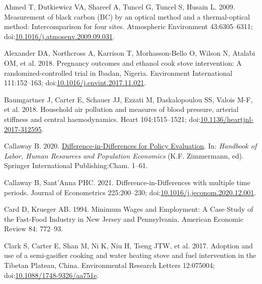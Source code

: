 \documentclass[
  letterpaper,
  DIV=11,
  numbers=noendperiod]{scrartcl}
\newlength{\cslhangindent}
\newlength{\cslentryspacingunit} %
\newenvironment{CSLReferences}[2] %
 {%
  \setlength{\parindent}{0pt}
  \ifodd #1
  \let\oldpar\par
  \def\par{\hangindent=\cslhangindent\oldpar}
  \fi
  \setlength{\parskip}{#2\cslentryspacingunit}
 }%
 {}
\begin{document}
\hypertarget{refs}{}
\begin{CSLReferences}{1}{0}
\leavevmode{}%
Ahmed T, Dutkiewicz VA, Shareef A, Tuncel G, Tuncel S, Husain L. 2009.
Measurement of black carbon ({BC}) by an optical method and a
thermal-optical method: {Intercomparison} for four sites. Atmospheric
Environment 43:6305--6311;
doi:\href{https://doi.org/10.1016/j.atmosenv.2009.09.031}{10.1016/j.atmosenv.2009.09.031}.

\leavevmode{}%
Alexander DA, Northcross A, Karrison T, Morhasson-Bello O, Wilson N,
Atalabi OM, et al. 2018. Pregnancy outcomes and ethanol cook stove
intervention: {A} randomized-controlled trial in {Ibadan}, {Nigeria}.
Environment International 111:152--163;
doi:\href{https://doi.org/10.1016/j.envint.2017.11.021}{10.1016/j.envint.2017.11.021}.

\leavevmode{}%
Baumgartner J, Carter E, Schauer JJ, Ezzati M, Daskalopoulou SS, Valois
M-F, et al. 2018. Household air pollution and measures of blood
pressure, arterial stiffness and central haemodynamics. Heart
104:1515--1521;
doi:\href{https://doi.org/10.1136/heartjnl-2017-312595}{10.1136/heartjnl-2017-312595}.

\leavevmode{}%
Callaway B. 2020.
\href{https://doi.org/10.1007/978-3-319-57365-6_352-1}{Difference-in-{Differences}
for {Policy Evaluation}}. In: \emph{Handbook of {Labor}, {Human
Resources} and {Population Economics}} (K.F. Zimmermann, ed). Springer
International Publishing:Cham. 1--61.

\leavevmode{}%
Callaway B, Sant'Anna PHC. 2021. Difference-in-{Differences} with
multiple time periods. Journal of Econometrics 225:200--230;
doi:\href{https://doi.org/10.1016/j.jeconom.2020.12.001}{10.1016/j.jeconom.2020.12.001}.

\leavevmode{}%
Card D, Krueger AB. 1994. Minimum {Wages} and {Employment}: {A Case
Study} of the {Fast-Food Industry} in {New Jersey} and {Pennsylvania}.
American Economic Review 84: 772--93.

\leavevmode{}%
Clark S, Carter E, Shan M, Ni K, Niu H, Tseng JTW, et al. 2017. Adoption
and use of a semi-gasifier cooking and water heating stove and fuel
intervention in the {Tibetan Plateau}, {China}. Environmental Research
Letters 12:075004;
doi:\href{https://doi.org/10.1088/1748-9326/aa751e}{10.1088/1748-9326/aa751e}.


\end{CSLReferences}
\end{document}
